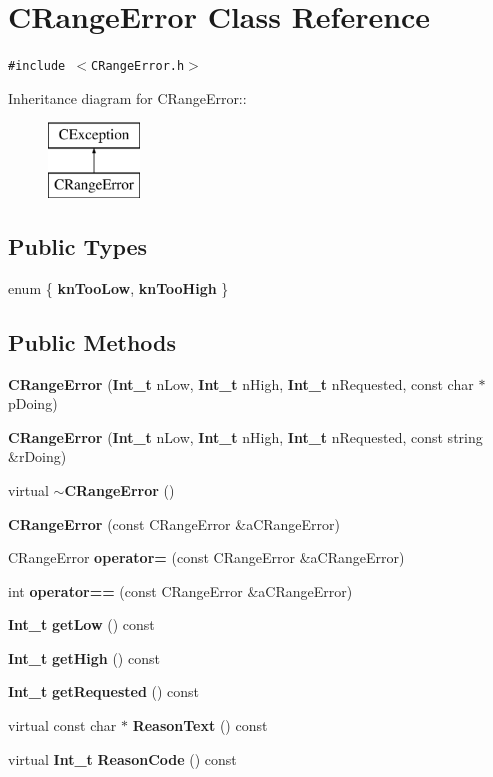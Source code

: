 \section{CRange\-Error  Class Reference}
\label{classCRangeError}
{\tt \#include $<$CRange\-Error.h$>$}

Inheritance diagram for CRange\-Error::\begin{figure}[H]
\begin{center}
\leavevmode
\includegraphics[height=2cm]{classCRangeError}
\end{center}
\end{figure}
\subsection*{Public Types}
\begin{CompactItemize}
\item 
enum \{ {\bf kn\-Too\-Low}, 
{\bf kn\-Too\-High}
 \}
\end{CompactItemize}
\subsection*{Public Methods}
\begin{CompactItemize}
\item 
{\bf CRange\-Error} ({\bf Int\_\-t} n\-Low, {\bf Int\_\-t} n\-High, {\bf Int\_\-t} n\-Requested, const char $\ast$p\-Doing)
\item 
{\bf CRange\-Error} ({\bf Int\_\-t} n\-Low, {\bf Int\_\-t} n\-High, {\bf Int\_\-t} n\-Requested, const string \&r\-Doing)
\item 
virtual {\bf $\sim$CRange\-Error} ()
\item 
{\bf CRange\-Error} (const CRange\-Error \&a\-CRange\-Error)
\item 
CRange\-Error {\bf operator=} (const CRange\-Error \&a\-CRange\-Error)
\item 
int {\bf operator==} (const CRange\-Error \&a\-CRange\-Error)
\item 
{\bf Int\_\-t} {\bf get\-Low} () const
\item 
{\bf Int\_\-t} {\bf get\-High} () const
\item 
{\bf Int\_\-t} {\bf get\-Requested} () const
\item 
virtual const char $\ast$ {\bf Reason\-Text} () const
\item 
virtual {\bf Int\_\-t} {\bf Reason\-Code} () const
\end{CompactItemize}
